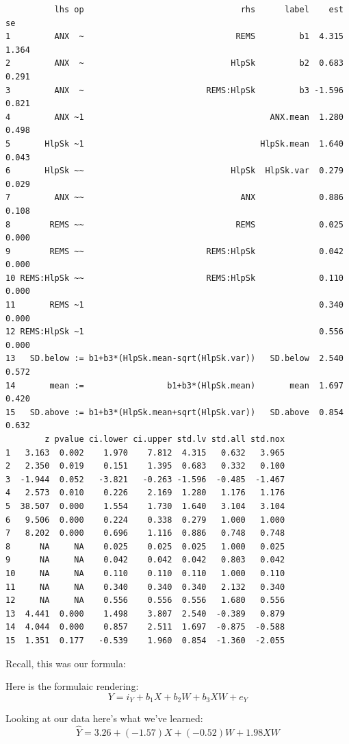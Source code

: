 \documentclass[
  11pt,
]{book}
\begin{document}
\begin{verbatim}
          lhs op                                rhs      label    est    se
1         ANX  ~                               REMS         b1  4.315 1.364
2         ANX  ~                              HlpSk         b2  0.683 0.291
3         ANX  ~                         REMS:HlpSk         b3 -1.596 0.821
4         ANX ~1                                      ANX.mean  1.280 0.498
5       HlpSk ~1                                    HlpSk.mean  1.640 0.043
6       HlpSk ~~                              HlpSk  HlpSk.var  0.279 0.029
7         ANX ~~                                ANX             0.886 0.108
8        REMS ~~                               REMS             0.025 0.000
9        REMS ~~                         REMS:HlpSk             0.042 0.000
10 REMS:HlpSk ~~                         REMS:HlpSk             0.110 0.000
11       REMS ~1                                                0.340 0.000
12 REMS:HlpSk ~1                                                0.556 0.000
13   SD.below := b1+b3*(HlpSk.mean-sqrt(HlpSk.var))   SD.below  2.540 0.572
14       mean :=                 b1+b3*(HlpSk.mean)       mean  1.697 0.420
15   SD.above := b1+b3*(HlpSk.mean+sqrt(HlpSk.var))   SD.above  0.854 0.632
        z pvalue ci.lower ci.upper std.lv std.all std.nox
1   3.163  0.002    1.970    7.812  4.315   0.632   3.965
2   2.350  0.019    0.151    1.395  0.683   0.332   0.100
3  -1.944  0.052   -3.821   -0.263 -1.596  -0.485  -1.467
4   2.573  0.010    0.226    2.169  1.280   1.176   1.176
5  38.507  0.000    1.554    1.730  1.640   3.104   3.104
6   9.506  0.000    0.224    0.338  0.279   1.000   1.000
7   8.202  0.000    0.696    1.116  0.886   0.748   0.748
8      NA     NA    0.025    0.025  0.025   1.000   0.025
9      NA     NA    0.042    0.042  0.042   0.803   0.042
10     NA     NA    0.110    0.110  0.110   1.000   0.110
11     NA     NA    0.340    0.340  0.340   2.132   0.340
12     NA     NA    0.556    0.556  0.556   1.680   0.556
13  4.441  0.000    1.498    3.807  2.540  -0.389   0.879
14  4.044  0.000    0.857    2.511  1.697  -0.875  -0.588
15  1.351  0.177   -0.539    1.960  0.854  -1.360  -2.055
\end{verbatim}

Recall, this was our formula:

Here is the formulaic rendering: \[Y = i_{Y}+ b_{1}X+ b_{2}W + b_{3}XW +e_{Y}\]

Looking at our data here's what we've learned: \[\hat{Y} = 3.26 + (-1.57)X + (-0.52)W + 1.98XW\]
\end{document}
